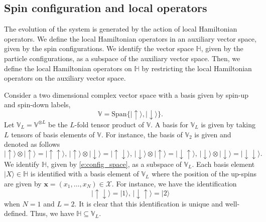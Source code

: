 \documentclass[a4paper,11pt]{article}
\theoremstyle{definition}
\begin{document}
\subsection{Spin configuration and local operators}

The evolution of the system is generated by the action of local Hamiltonian operators. We define the local Hamiltonian operators in an auxiliary vector space, given by the spin configurations. We identify the vector space $\mathbb{H}$, given by the particle configurations, as a subspace of the auxiliary vector space. Then, we define the local Hamiltonian operators on $\mathbb{H}$ by restricting the local Hamiltonian operators on the auxiliary vector space.

Consider a two dimensional complex vector space with a basis given by spin-up and spin-down labels,
\begin{equation}
    \mathbb{V} = \mathrm{Span}\{ \mid \uparrow \rangle, \mid \downarrow \rangle \}.
\end{equation}
Let $\mathbb{V}_{L} = \mathbb{V}^{\otimes L}$ be the $L$-fold tensor product of $\mathbb{V}$. A basis for $\mathbb{V}_{L}$ is given by taking $L$ tensors of basis elements of $\mathbb{V}$. For instance, the basis of $\mathbb{V}_2$ is given and denoted as follows
\begin{equation}
    \mid \uparrow \rangle \otimes \mid \uparrow \rangle = \mid \uparrow \uparrow \rangle,\, \mid \uparrow \rangle \otimes \mid \downarrow \rangle = \mid \uparrow \downarrow \rangle,\, \mid \downarrow \rangle \otimes \mid \uparrow \rangle = \mid \downarrow \uparrow \rangle,\, \mid \downarrow \rangle \otimes \mid \downarrow \rangle = \mid \downarrow \downarrow \rangle.
\end{equation}
We identify $\mathbb{H}$, given by \eqref{e:config_space}, as a subspace of $\mathbb{V}_L$. Each basis element $|X \rangle \in \mathbb{H}$ is identified with a basis element of $\mathbb{V}_L$ where the position of the up-spins are given by $\mathbf{x}= (x_1, \dots, x_N) \in \mathcal{X}$. For instance, we have the identification
\begin{equation}
    \mid \uparrow \downarrow \rangle = | 1 \rangle,\,  \mid \downarrow \uparrow \rangle = | 2 \rangle
\end{equation}
when $N=1$ and $L=2$. It is clear that this identification is unique and well-defined. Thus, we have $\mathbb{H} \subseteq \mathbb{V}_L$.
\end{document}
